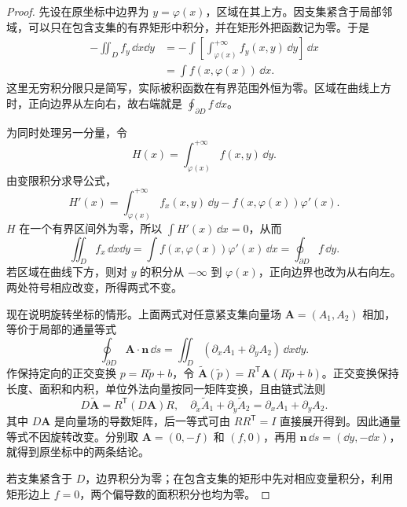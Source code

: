\begin{proof}
先设在原坐标中边界为 $y=\varphi(x)$，区域在其上方。因支集紧含于局部邻域，可以只在包含支集的有界矩形中积分，并在矩形外把函数记为零。于是
\begin{align*}
-\displaystyle\iint_D f_y\,\dd x\dd y
&=-\int\left[\int_{\varphi(x)}^{+\infty}f_y(x,y)\,\dd y\right]\,\dd x\\
&=\int f(x,\varphi(x))\,\dd x.
\end{align*}
这里无穷积分限只是简写，实际被积函数在有界范围外恒为零。区域在曲线上方时，正向边界从左向右，故右端就是 $\displaystyle \oint_{\partial D}f\,\dd x$。

为同时处理另一分量，令
\[
H(x)=\int_{\varphi(x)}^{+\infty} f(x,y)\,\dd y.
\]
由变限积分求导公式，
\[
H'(x)=\int_{\varphi(x)}^{+\infty}f_x(x,y)\,\dd y
-f(x,\varphi(x))\varphi'(x).
\]
$H$ 在一个有界区间外为零，所以 $\displaystyle \int H'(x)\,\dd x=0$，从而
\[
\displaystyle\iint_D f_x\,\dd x\dd y
=\int f(x,\varphi(x))\varphi'(x)\,\dd x
=\oint_{\partial D}f\,\dd y.
\]
若区域在曲线下方，则对 $y$ 的积分从 $-\infty$ 到 $\varphi(x)$，正向边界也改为从右向左。两处符号相应改变，所得两式不变。

现在说明旋转坐标的情形。上面两式对任意紧支集向量场 $\boldsymbol A=(A_1,A_2)$ 相加，等价于局部的通量等式
\[
\oint_{\partial D}\boldsymbol A\cdot\boldsymbol n\,\dd s
=\displaystyle\iint_D(\partial_xA_1+\partial_yA_2)\,\dd x\dd y.
\]
作保持定向的正交变换 $p=R\widetilde p+b$，令 $\widetilde{\boldsymbol A}(\widetilde p)=R^{\mathsf T}\boldsymbol A(R\widetilde p+b)$。正交变换保持长度、面积和内积，单位外法向量按同一矩阵变换，且由链式法则
\[
D\widetilde{\boldsymbol A}=R^{\mathsf T}(D\boldsymbol A)R,
\quad
\partial_{\widetilde x}\widetilde A_1+\partial_{\widetilde y}\widetilde A_2
=\partial_xA_1+\partial_yA_2.
\]
其中 $D\boldsymbol A$ 是向量场的导数矩阵，后一等式可由 $RR^{\mathsf T}=I$ 直接展开得到。因此通量等式不因旋转改变。分别取 $\boldsymbol A=(0,-f)$ 和 $(f,0)$，再用 $\boldsymbol n\,\dd s=(\dd y,-\dd x)$，就得到原坐标中的两条结论。

若支集紧含于 $D$，边界积分为零；在包含支集的矩形中先对相应变量积分，利用矩形边上 $f=0$，两个偏导数的面积积分也均为零。
\end{proof}

